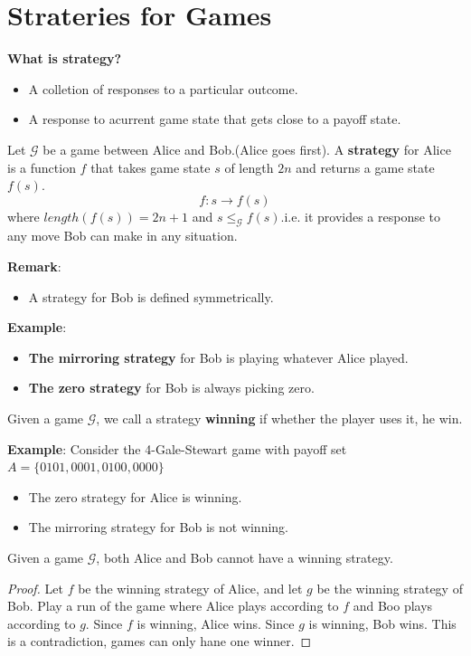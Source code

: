 \section{Strateries for Games}

\noindent \textbf{What is strategy?}
\begin{itemize}
    \item A colletion of responses to a particular outcome.
    \item A response to acurrent game state that gets close to a payoff state.
\end{itemize}

\begin{definition}
    Let $\mathcal{G}$ be a game between Alice and Bob.(Alice goes first). 
    A \textbf{strategy} for Alice is a function $f$ that takes game state $s$ of length $2n$ and returns a game state $f(s)$.
    $$f:s \longrightarrow f(s)$$
    where $length(f(s))=2n+1$ and $s \leq_{\mathcal{G}} f(s)$.i.e. it provides a response to any move Bob can make in any situation.
\end{definition}
\textbf{Remark}:
\begin{itemize}
    \item A strategy for Bob is defined symmetrically.
\end{itemize}

\textbf{Example}:
\begin{itemize}
    \item \textbf{The mirroring strategy} for Bob is playing whatever Alice played.
    \item \textbf{The zero strategy} for Bob is always picking zero.
\end{itemize}

\begin{definition}
    Given a game $\mathcal{G}$, we call a strategy \textbf{winning} if whether the player uses it, he win.
\end{definition}
\textbf{Example}:
Consider the 4-Gale-Stewart game with payoff set $A=\{0101,0001,0100,0000\}$
\begin{itemize}
    \item The zero strategy for Alice is winning.
    \item The mirroring strategy for Bob is not winning.
\end{itemize}

\begin{theorem}
    Given a game $\mathcal{G}$, both Alice and Bob cannot have a winning strategy.
\end{theorem}
\begin{proof}
    Let $f$ be the winning strategy of Alice, and let $g$ be the winning strategy of Bob. 
    Play a run of the game where Alice plays according to $f$ and Boo plays according to $g$. 
    Since $f$ is winning, Alice wins. Since $g$ is winning, Bob wins. 
    This is a contradiction, games can only hane one winner.
\end{proof}


